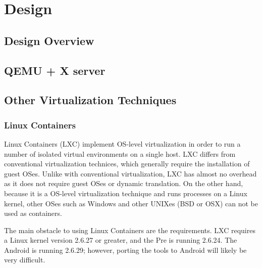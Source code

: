\section{Design}
\subsection{Design Overview}
\subsection{QEMU + X server}
\subsection{Other Virtualization Techniques}
\subsubsection{Linux Containers}
Linux Containers (LXC) implement OS-level virtualization in order to run a number of isolated virtual environments on a single host.  LXC differs from conventional virtualization technices, which generally require the installation of guest OSes.  Unlike with conventional virtualization, LXC has almost no overhead as it does not require guest OSes or dynamic translation.  On the other hand, because it is a OS-level virtualization technique and runs processes on a Linux kernel, other OSes such as Windows and other UNIXes (BSD or OSX) can not be used as containers.  

The main obstacle to using Linux Containers are the requirements.  LXC requires a Linux kernel version 2.6.27 or greater, and the Pre is running 2.6.24.  The Android is running 2.6.29; however, porting the tools to Android will likely be very difficult.
